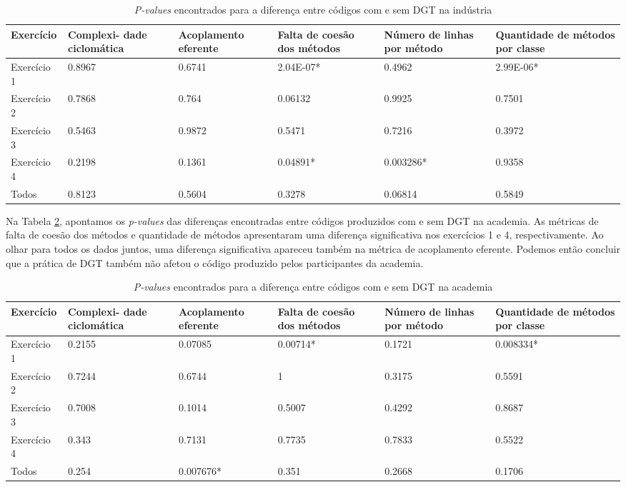 \begin{table}[h!]
	\centering
	\begin{tabular}{ | p{3cm} | p{2cm} | p{2cm} | p{2cm} | p{2cm} | p{2cm} |}
		\hline
		Exercício & Complexi- dade ciclomática & Acoplamento eferente & Falta de coesão dos métodos & Número de linhas por método 
		& Quantidade de métodos por classe \\
		\hline
		Exercício 1 &	0.8967	&	0.6741 &	2.04E-07* &	0.4962 &	2.99E-06* \\
		Exercício 2	& 0.7868	&	0.764 &	0.06132 &	0.9925 &	0.7501 \\
		Exercício 3	& 0.5463	&	0.9872 &	0.5471 &	0.7216 &	0.3972\\
		Exercício 4	& 0.2198	&	0.1361 &	0.04891* &	0.003286* &	0.9358\\
		\hline
		Todos &	0.8123	&	0.5604 &	0.3278 &	0.06814 &	0.5849\\
		\hline
	\end{tabular}
	\caption{\textit{P-values} encontrados para a diferença entre códigos com e sem DGT na indústria}
	\label{metricas-industria}
\end{table}

Na Tabela \ref{metricas-academia}, apontamos os \textit{p-values} das diferenças encontradas
entre códigos produzidos com e sem DGT na academia. As métricas de 
falta de coesão dos métodos e quantidade de métodos apresentaram
uma diferença significativa nos exercícios 1 e 4, respectivamente.
Ao olhar para todos os dados juntos, uma diferença significativa
apareceu também na métrica de acoplamento eferente.
Podemos então concluir que a prática de DGT também não afetou
o código produzido pelos participantes da academia.

\begin{table}[h!]
	\centering
	\begin{tabular}{ | p{3cm} | p{2cm} | p{2cm} | p{2cm} | p{2cm} | p{2cm} |}
		\hline
		Exercício & Complexi- dade ciclomática & Acoplamento eferente & Falta de coesão dos métodos & Número de linhas por método 
		& Quantidade de métodos por classe \\
		\hline
			Exercício 1	& 0.2155	&	0.07085	& 0.00714* &	0.1721	& 0.008334*\\
			Exercício 2	& 0.7244	&	0.6744	& 1 &	0.3175 &	0.5591\\
			Exercício 3	& 0.7008	&	0.1014 &	0.5007	& 0.4292	& 0.8687\\
			Exercício 4	& 0.343	&	0.7131 &	0.7735	& 0.7833	& 0.5522\\
		\hline
			Todos &	0.254	&	0.007676* & 0.351 & 0.2668 & 0.1706\\
		\hline
	\end{tabular}
	\caption{\textit{P-values} encontrados para a diferença entre códigos com e sem DGT na academia}
	\label{metricas-academia}
\end{table}

